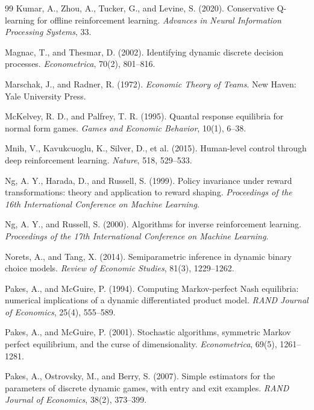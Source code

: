 \documentclass[11pt]{article}
\theoremstyle{definition}
\begin{document}
\begin{thebibliography}{99}
Kumar, A., Zhou, A., Tucker, G., and Levine, S. (2020). Conservative Q-learning for offline reinforcement learning. \emph{Advances in Neural Information Processing Systems}, 33.

Magnac, T., and Thesmar, D. (2002). Identifying dynamic discrete decision processes. \emph{Econometrica}, 70(2), 801--816.

Marschak, J., and Radner, R. (1972). \emph{Economic Theory of Teams}. New Haven: Yale University Press.

McKelvey, R. D., and Palfrey, T. R. (1995). Quantal response equilibria for normal form games. \emph{Games and Economic Behavior}, 10(1), 6--38.

Mnih, V., Kavukcuoglu, K., Silver, D., et al. (2015). Human-level control through deep reinforcement learning. \emph{Nature}, 518, 529--533.

Ng, A. Y., Harada, D., and Russell, S. (1999). Policy invariance under reward transformations: theory and application to reward shaping. \emph{Proceedings of the 16th International Conference on Machine Learning}.

Ng, A. Y., and Russell, S. (2000). Algorithms for inverse reinforcement learning. \emph{Proceedings of the 17th International Conference on Machine Learning}.

Norets, A., and Tang, X. (2014). Semiparametric inference in dynamic binary choice models. \emph{Review of Economic Studies}, 81(3), 1229--1262.

Pakes, A., and McGuire, P. (1994). Computing Markov-perfect Nash equilibria: numerical implications of a dynamic differentiated product model. \emph{RAND Journal of Economics}, 25(4), 555--589.

Pakes, A., and McGuire, P. (2001). Stochastic algorithms, symmetric Markov perfect equilibrium, and the curse of dimensionality. \emph{Econometrica}, 69(5), 1261--1281.

Pakes, A., Ostrovsky, M., and Berry, S. (2007). Simple estimators for the parameters of discrete dynamic games, with entry and exit examples. \emph{RAND Journal of Economics}, 38(2), 373--399.


\end{thebibliography}
\end{document}
